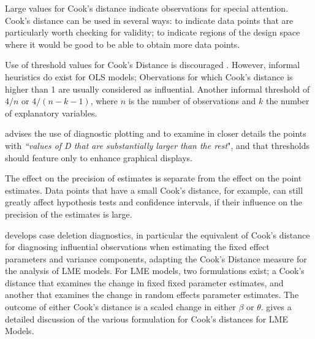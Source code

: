 \documentclass[12pt, a4paper]{report}
\theoremstyle{plain}
\theoremstyle{definition}
\theoremstyle{remark}
\begin{document}
Large values for Cook's distance indicate observations for special attention. Cook's distance can be used in several ways: to indicate data points that are particularly worth checking for validity; to indicate regions of the design space where it would be good to be able to obtain more data points.

Use of threshold values for Cook's Distance is discouraged \citep{fox1997}. However, informal heuristics do exist for OLS models; Obervations for which Cook's distance is higher than 1 are usually considered as influential. Another informal threshold of $4/n$ or $4/(n-k-1)$, where $n$ is the number of observations and $k$ the number of explanatory variables.

\citet{fox1997} advises the use of diagnostic plotting and to examine in closer details the points with \textit{``values of D that are substantially larger than the rest}", and that thresholds should feature only to enhance graphical displays.

The effect on the precision of estimates is separate from the effect on the point estimates. Data points that have a small Cook's distance, for example, can still greatly affect hypothesis tests and confidence intervals, if their  influence on the precision of the estimates is large.

\citet{Christensen} develops  case deletion diagnostics, in particular the equivalent of  Cook's distance for diagnosing influential observations when estimating the fixed effect parameters and variance components, adapting the Cook's Distance measure for the analysis of LME models. For LME models, two formulations exist; a Cook's distance that examines the change in fixed fixed parameter estimates, and another that examines the change in random effects parameter estimates. The outcome of either Cook's distance is a scaled change in either $\beta$ or $\theta$. \citet{Zewotir} gives a detailed discussion of the various formulation for Cook's distances for LME Models.
\end{document}
